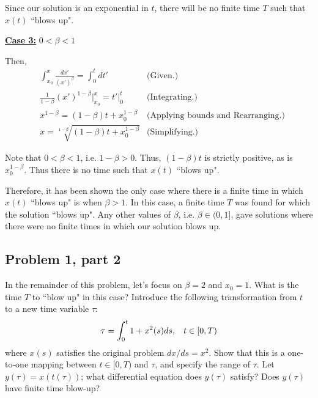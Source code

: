 \begin{solution}
Since our solution is an exponential in $t$, there will be no finite time $T$ such that $x(t)$ ``blows up".

\newpage
\underline{\textbf{Case 3:}} $0 < \beta < 1$

Then,
\begin{align}
    &\int_{x_0}^x \frac{dx'}{(x')^\beta} = \int_0^t dt' &\text{(Given.)}\nonumber\\
    &\frac{1}{1 - \beta}(x')^{1 - \beta}\bigg|_{x_0}^x = t' \bigg|_0^t &\text{(Integrating.)}\nonumber\\
    &x^{1 - \beta} = (1 - \beta)t + x_0^{1 - \beta} &\text{(Applying bounds and Rearranging.)} \nonumber\\
    &x = \sqrt[1 - \beta]{(1 - \beta)t + x_0^{1 - \beta}} &\text{(Simplifying.)}\nonumber
\end{align}

Note that $0 < \beta < 1$, i.e. $1 - \beta > 0$. Thus, $(1 - \beta)t$ is strictly positive, as is $x_0^{1 - \beta}$. Thus there is no time such that $x(t)$ ``blows up".

\alignbreak

Therefore, it has been shown the only case where there is a finite time in which $x(t)$ ``blows up" is when $\beta > 1$. In this case, a finite time $T$ was found for which the solution ``blows up". Any other values of $\beta$, i.e. $\beta \in (0, 1]$, gave solutions where there were no finite times in which our solution blows up.

\jump
\end{solution}%

\newpage
\subsection{Problem 1, part 2}
In the remainder of this problem, let's focus on $\beta = 2$  and $x_0 = 1$. What is the time $T$ to ``blow up" in this case? Introduce the following transformation from $t$ to a new time variable $\tau$:
\[
\tau = \int_0^t 1 + x^2(s) ds, \hspace{3mm} t\in [0,T)
\]
where $x(s)$ satisfies the original problem $dx/ds = x^2$. Show that this is a one-to-one mapping between $t \in [0, T)$ and $\tau$, and specify the range of $\tau$. Let $y(\tau) = x(t(\tau))$; what differential equation does $y(\tau)$ satisfy? Does $y(\tau)$ have finite time blow-up? 

